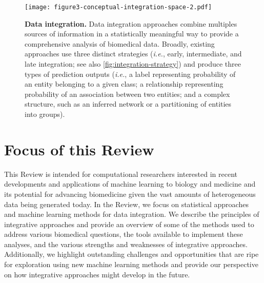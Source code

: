 \documentclass[5p]{elsarticle}
\newcommand{\ie}{\emph{i.e.}\xspace}
\newcommand{\rev}[1]{{\color{black}#1}}
\begin{document}

\begin{figure}[t]
\centering
\texttt{[image: figure3-conceptual-integration-space-2.pdf]}
\caption{\textbf{Data integration.} Data integration approaches combine multiples sources of information in a statistically meaningful way to provide a comprehensive analysis of \rev{biomedical data}. Broadly, existing approaches \rev{use three distinct strategies} (\ie, early, intermediate, and late integration; see also \autoref{fig:integration-strategy}) and produce three types of prediction outputs (\ie, a label representing probability of an entity belonging to a given class; a relationship representing probability of an association between two entities; and a complex structure, such as an inferred network or a partitioning of entities into groups).}
\label{fig:integration-strategy-prediction-type}
\end{figure}


\section{Focus of this \rev{Review}}

This Review is intended for computational researchers \rev{interested in} recent developments and applications of machine learning to biology and medicine and its potential for advancing biomedicine given the vast amounts of heterogeneous data being generated today.
In the Review, we focus on statistical approaches and machine learning methods for data integration.
We describe the principles of integrative approaches and provide an overview of some of the \rev{methods used to address various biomedical questions}, the tools available to implement these analyses, and the various strengths and weaknesses of integrative approaches.
Additionally, we highlight outstanding challenges and opportunities that are ripe for exploration using \rev{new machine learning methods and provide} our perspective on how integrative approaches might develop in the future.
\end{document}
